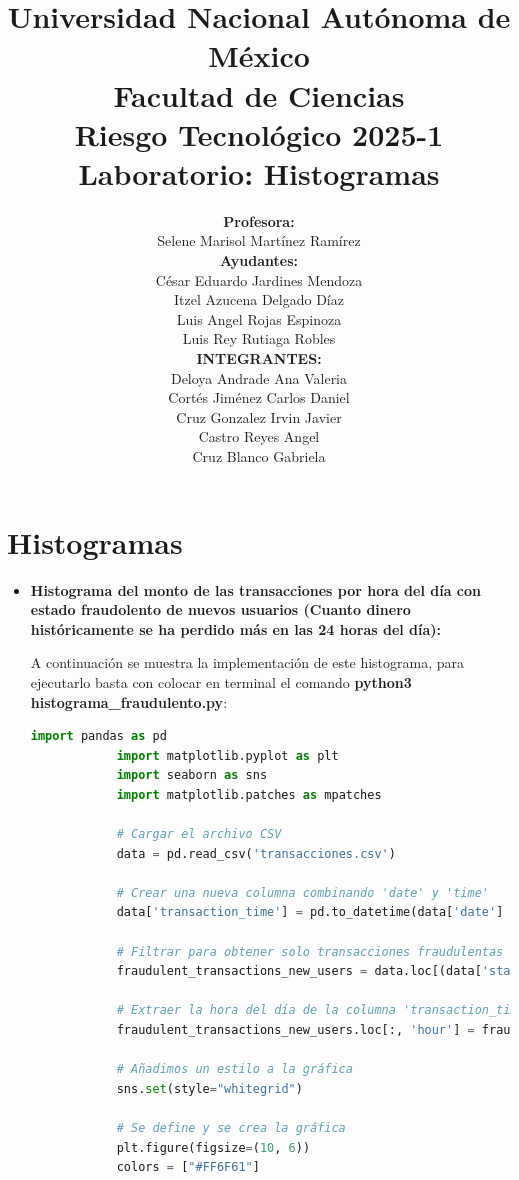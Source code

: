 \documentclass{article}
\title{Universidad Nacional Autónoma de México \\\bigskip Facultad de Ciencias \\\bigskip Riesgo Tecnológico 2025-1 \\\bigskip \textbf{Laboratorio: Histogramas}}
\author{\textbf{Profesora:} \\\bigskip Selene Marisol Martínez Ramírez \\\bigskip \textbf{Ayudantes:} \\\bigskip  César Eduardo Jardines Mendoza \\\bigskip Itzel Azucena Delgado Díaz \\\bigskip Luis Angel Rojas Espinoza \\\bigskip Luis Rey Rutiaga Robles \\\bigskip \textbf{INTEGRANTES:} \\\bigskip Deloya Andrade Ana Valeria \\\bigskip Cortés Jiménez Carlos Daniel \\\bigskip Cruz Gonzalez Irvin Javier \\\bigskip Castro Reyes Angel \\\bigskip Cruz Blanco Gabriela}
\begin{document}
\maketitle

\newpage
 
\section{Histogramas}

\begin{itemize}
    \item \textbf{Histograma del monto de las transacciones por hora del día con estado fraudolento de nuevos usuarios (Cuanto dinero históricamente se ha perdido más en las 24 horas del día):}

        A continuación se muestra la implementación de este histograma, para ejecutarlo basta con colocar en terminal el comando \textbf{python3 histograma_fraudulento.py}:

        \begin{lstlisting}[language=Python, caption=Implementación del Histograma del monto de transacciones por hora del día]
            import pandas as pd
            import matplotlib.pyplot as plt
            import seaborn as sns
            import matplotlib.patches as mpatches
            
            # Cargar el archivo CSV
            data = pd.read_csv('transacciones.csv')
            
            # Crear una nueva columna combinando 'date' y 'time'
            data['transaction_time'] = pd.to_datetime(data['date'] + ' ' + data['time'], format='%d/%m/%Y %H:%M')
            
            # Filtrar para obtener solo transacciones fraudulentas de nuevos usuarios
            fraudulent_transactions_new_users = data.loc[(data['status'] == 'fraudulent') & (data['new_user'] == True)]
            
            # Extraer la hora del día de la columna 'transaction_time'
            fraudulent_transactions_new_users.loc[:, 'hour'] = fraudulent_transactions_new_users['transaction_time'].dt.hour
            
            # Añadimos un estilo a la gráfica
            sns.set(style="whitegrid")
            
            # Se define y se crea la gráfica
            plt.figure(figsize=(10, 6))
            colors = ["#FF6F61"]
            

\end{lstlisting}
\end{itemize}
\end{document}
